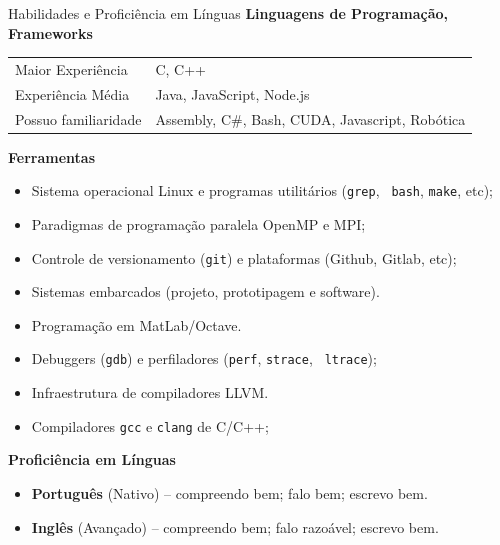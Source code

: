 \documentclass[a4paper]{resume}
\begin{document}
\begin{rSection}{Habilidades e Proficiência em Línguas}
{\bf Linguagens de Programação, Frameworks}

\begin{tabular}{ll}
  Maior Experiência & C, C++ \\
  Experiência Média & Java, JavaScript, Node.js\\
  Possuo familiaridade & Assembly, C\#, Bash, CUDA, Javascript, Robótica \\
\end{tabular}

{\bf Ferramentas}
\begin{itemize}[noitemsep]
  \item Sistema operacional Linux e programas utilitários ({\tt grep}, {\tt
    bash}, {\tt make}, etc);
  \item Paradigmas de programação paralela OpenMP e MPI;
  \item Controle de versionamento ({\tt git}) e plataformas (Github, Gitlab,
    etc);
  \item Sistemas embarcados (projeto, prototipagem e software).
  \item Programação em MatLab/Octave.
  \item Debuggers ({\tt gdb}) e perfiladores ({\tt perf}, {\tt strace}, {\tt
    ltrace});
  \item Infraestrutura de compiladores LLVM.
  \item Compiladores {\tt gcc} e {\tt clang} de C/C++;
\end{itemize}

{\bf Proficiência em Línguas}
\begin{itemize}[noitemsep]
  \item {\bf Português} (Nativo) -- compreendo bem; falo bem; escrevo bem.
  \item {\bf Inglês} (Avançado) -- compreendo bem; falo razoável; escrevo bem.
\end{itemize}
\end{rSection}
\end{document}
